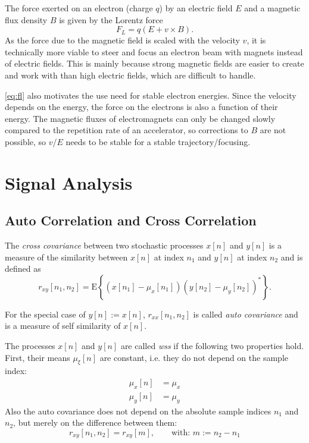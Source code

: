 The force exerted on an electron (charge $q$) by an electric field $E$ and a magnetic flux density $B$ is given by the Lorentz force \cite[p.~19]{Hinterberger1997}
\begin{equation}\label{eq:fl}
F_L = q\left(E+v\times B\right).
\end{equation}
As the force due to the magnetic field is scaled with the velocity $v$, it is technically more viable to steer and focus an electron beam with magnets instead of electric fields. This is mainly because strong magnetic fields are easier to create and work with than high electric fields, which are difficult to handle. \cite[p.~27]{Krieger2013}

\autoref{eq:fl} also motivates the use need for stable electron energies. Since the velocity depends on the energy, the force on the electrons is also a function of their energy. The magnetic fluxes of electromagnets can only be changed slowly compared to the repetition rate of an accelerator, so corrections to $B$ are not possible, so $v$/$E$ needs to be stable for a stable trajectory/focusing.




\section{Signal Analysis}
\subsection{Auto Correlation and Cross Correlation}
The \textit{cross covariance} between two stochastic processes $x[n]$ and $y[n]$ is a measure of the similarity between $x[n]$ at index $n_1$ and $y[n]$ at index $n_2$ and is defined as
\begin{equation}\label{eq:crosscovariance}
r_{xy}[n_1,n_2] = \text{E}\left\{(x[n_1]-\mu_x[n_1])(y[n_2]-\mu_y[n_2])^\ast\right\}.
\end{equation}

For the special case of $y[n]:=x[n]$, $r_{xx}[n_1,n_2]$ is called \textit{auto covariance} and is a measure of self similarity of $x[n]$. \cite[p.~172]{Park2017}

The processes $x[n]$ and $y[n]$ are called \textit{\gls{wss}} if the following two properties hold. \cite[p.~167]{Park2017}
First, their means $\mu_{\xi}[n]$ are constant, i.e. they do not depend on the sample index:
\begin{align}
\mu_{x}[n] &= \mu_x\\
\mu_{y}[n] &= \mu_y
\end{align}
Also the auto covariance does not depend on the absolute sample indices $n_1$ and $n_2$, but merely on the difference between them:
\begin{equation}
r_{xy}[n_1,n_2] = r_{xy}[m],\qquad \text{with: } m:=n_2-n_1
\end{equation}

